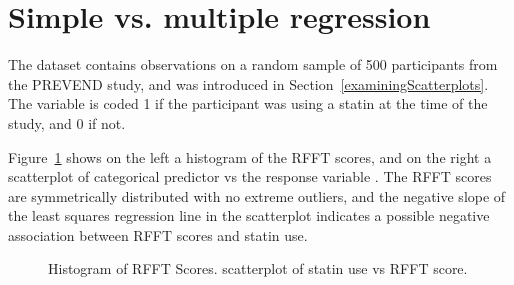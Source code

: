 \section{Simple vs. multiple regression}
\label{simpleVsMultipleRegression}

The dataset  contains observations on a random sample of 500 participants from the PREVEND study, and was introduced in Section~\ref{examiningScatterplots}.  The variable  is coded 1 if the participant was using a statin at the time of the study, and 0 if not.  

Figure~\ref{statinRFFTPlots} shows on the left a histogram of the RFFT scores, and on the right a scatterplot of categorical predictor  vs the response variable .  The RFFT scores are symmetrically distributed with no extreme outliers, and the negative slope of the least squares regression line in the scatterplot indicates a possible negative association between RFFT scores and statin use.

\begin{figure}[ht]
	\centering
	\caption{ Histogram of RFFT Scores.  scatterplot of statin use vs RFFT score.}
	\label{statinRFFTPlots}
\end{figure}


